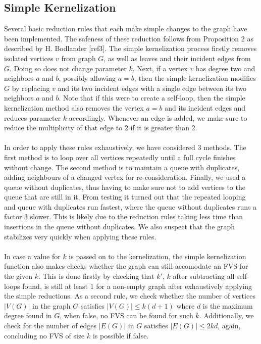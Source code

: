 \subsection{Simple Kernelization} %
Several basic reduction rules that each make simple changes to the graph have been implemented. The safeness of these reduction follows from Proposition 2 as described by H. Bodlander [ref3]. The simple kernelization process firstly removes isolated vertices $v$ from graph $G$, as well as leaves and their incident edges from $G$. Doing so does not change parameter $k$. Next, if a vertex $v$ has degree two and neighbors $a$ and $b$, possibly allowing $a=b$, then the simple kernelization modifies $G$ by replacing $v$ and its two incident edges with a single edge between its two neighbors $a$ and $b$. Note that if this were to create a self-loop, then the simple kernelization method also removes the vertex $a=b$ and its incident edges and reduces parameter $k$ accordingly. Whenever an edge is added, we make sure to reduce the multiplicity of that edge to $2$ if it is greater than $2$. \\\\
In order to apply these rules exhaustively, we have considered $3$ methods. The first method is to loop over all vertices repeatedly until a full cycle finishes without change. The second method is to maintain a queue with duplicates, adding neighbours of a changed vertex for re-consideration. Finally, we used a queue without duplicates, thus having to make sure not to add vertices to the queue that are still in it. From testing it turned out that the repeated looping and queue with duplicates run fastest, where the queue without duplicates runs a factor $3$ slower. This is likely due to the reduction rules taking less time than insertions in the queue without duplicates. We also suspect that the graph stabilizes very quickly when applying these rules.\\\\
In case a value for $k$ is passed on to the kernelization, the simple kernelization function also makes checks whether the graph can still accomodate an FVS for the given $k$. This is done firstly by checking that $k'$, $k$ after subtracting all self-loops found, is still at least $1$ for a non-empty graph after exhaustively applying the simple reductions. As a second rule, we check whether the number of vertices $|V(G)|$ in the graph $G$ satisfies $|V(G)|\leq k(d+1)$ where $d$ is the maximum degree found in $G$, when false, no FVS can be found for such $k$. Additionally, we check for the number of edges $|E(G)|$ in $G$ satisfies $|E(G)|\leq 2kd$, again, concluding no FVS of size $k$ is possible if false.
